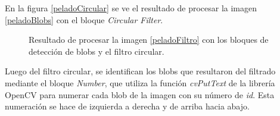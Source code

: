 En la figura \ref{peladoCircular} se ve el resultado de procesar la imagen \ref{peladoBlobs} con el bloque \emph{Circular Filter}.

\begin{figure}[ht!]
        \centering
        \hspace{3 mm}
  \caption{Resultado de procesar la imagen \ref{peladoFiltro} con los bloques de detección de blobs y el filtro circular.}
      \label{ejemplocircularfilter}
\end{figure}

Luego del filtro circular, se identifican los blobs que resultaron del filtrado mediante el bloque \emph{Number}, que utiliza la función \emph{cvPutText} de la librería  OpenCV\cite{opencv} para numerar cada blob de la imagen con su número de \textit{id}. Esta numeración se hace de izquierda a derecha y de arriba hacia abajo.\\


